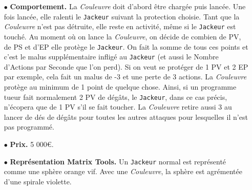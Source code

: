 \documentclass[11pt,twoside,a4paper]{article}
\begin{document}
\begin{multicols*}{2}
\begin{itemize}
	\item[$\bullet$] \textbf{Comportement. }La \emph{Couleuvre} doit d'abord {\^e}tre charg{\'e}e puis lanc{\'e}e. Une fois lanc{\'e}e, elle ralenti le \texttt{Jackeur} suivant la protection choisie. Tant que la \emph{Couleuvre} n'est pas d{\'e}truite, elle reste en activit{\'e}, m{\^e}me si le \texttt{Jackeur} est touch{\'e}. Au moment o{\`u} on lance la \emph{Couleuvre}, on d{\'e}cide de combien de PV, de PS et d'EP elle prot{\`e}ge le \texttt{Jackeur}. On fait la somme de tous ces points et c'est le malus suppl{\'e}mentaire inflig{\'e} au \texttt{Jackeur} (et aussi le Nombre d'Actions par Seconde que l'on perd). Si on veut se prot{\'e}ger de 1 PV et 2 EP par exemple, cela fait un malus de -3 et une perte de 3 actions. La \emph{Couleuvre} prot{\`e}ge au minimum de 1 point de quelque chose. Ainsi, si un programme tueur fait normalement 2 PV de d{\'e}g{\^a}ts, le \texttt{Jackeur}, dans ce cas pr{\'e}cis, n'{\'e}copera que de 1 PV s'il se fait toucher. La \emph{Couleuvre} retire aussi 3 au lancer de d{\'e}s de d{\'e}g{\^a}ts pour toutes les autres attaques pour lesquelles il n'est pas programm{\'e}. 
	\item[$\bullet$] \textbf{Prix. }5 000\euro . 
	\item[$\bullet$] \textbf{Repr{\'e}sentation Matrix Tools. }Un \texttt{Jackeur} normal est repr{\'e}sent{\'e} comme une sph{\`e}re orange vif. Avec une \emph{Couleuvre}, la sph{\`e}re est agr{\'e}ment{\'e}e d'une spirale violette. 
\end{itemize} %


\end{multicols*}
\end{document}
